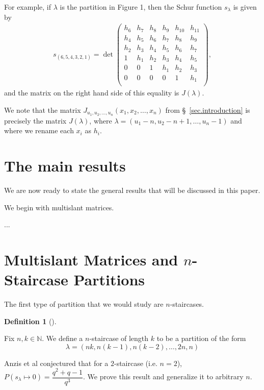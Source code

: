 \documentclass[numbers=enddot,12pt,final,onecolumn,notitlepage]{scrartcl}%
\theoremstyle{definition}
\newtheorem{defi}[theo]{Definition}
\newenvironment{definition}[1][]
{\begin{defi}[#1]\begin{leftbar}}
{\end{leftbar}\end{defi}}
\newcommand{\NN}{\mathbb{N}}
\newcommand{\tup}[1]{\left( #1 \right)}
\theoremstyle{plainsl}
\begin{document}
For example, if $\lambda$ is the partition in Figure 1, then the Schur function $s_\lambda$ is given by
\begin{align*}
s_{(6,5,4,3,2,1)} =
\det
\begin{pmatrix}
h_6 & h_7 & h_8 & h_{9} & h_{10}& h_{11} \\ 
h_4 & h_5 & h_6 & h_{7} & h_{8}& h_{9} \\
h_2 & h_3 & h_4 & h_{5} & h_{6}& h_{7} \\
1 & h_1 & h_2 & h_{3} & h_{4}& h_{5} \\
0 & 0 & 1 & h_{1} & h_{2}& h_{3} \\
0 & 0 & 0 & 0 & 1 & h_{1} \\
\end{pmatrix} ,
\end{align*}
and the matrix on the right hand side of this equality is $J\tup{\lambda}$.


We note that the matrix $J_{u_1, u_2, \ldots, u_n}\tup{x_1, x_2, \ldots, x_n}$
from \S~\ref{sec.introduction} is precisely the matrix
$J\tup{\lambda}$, where
$\lambda = \tup{u_1 - n, u_2 - n+1, \ldots, u_n -1}$
and where we rename each $x_i$ as $h_i$.



\section{The main results}

We are now ready to state the general results that will be discussed in this paper.

We begin with multislant matrices.

...



\section{Multislant Matrices and $n$-Staircase Partitions}
The first type of partition that we would study are $n$-staircases. 
\begin{definition}
\label{nstaircasedef}
Fix $n,k \in \NN$.
We define a $n$-staircase of length $k$ to be a partition of the form 
\[\lambda = (nk, n(k-1), n(k-2), \ldots,2n, n) \] 

\end{definition}
Anzis et al \cite{Anzis18} conjectured that for a $2$-staircase (i.e. $n=2$),  $P(s_{\lambda} \longmapsto 0) = \dfrac{q^2+q -1}{q^3}$. We prove this result and generalize it to arbitrary $n$.
\end{document}
